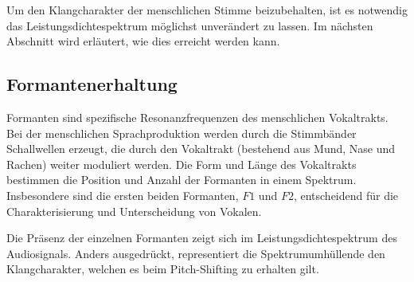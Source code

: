 
Um den Klangcharakter der menschlichen Stimme beizubehalten,
ist es notwendig das Leistungsdichtespektrum möglichst unverändert zu lassen.
Im nächsten Abschnitt wird erläutert, wie dies erreicht werden kann.


\subsection{Formantenerhaltung
\label{autotune:subsection:formantenErhaltung}}
Formanten sind spezifische Resonanzfrequenzen des menschlichen Vokaltrakts.
Bei der menschlichen Sprachproduktion werden durch die Stimmbänder Schallwellen erzeugt,
die durch den Vokaltrakt (bestehend aus Mund, Nase und Rachen) weiter moduliert werden.
Die Form und Länge des Vokaltrakts bestimmen die Position und Anzahl der Formanten in einem Spektrum. 
Insbesondere sind die ersten beiden Formanten, $F1$ und $F2$,
entscheidend für die Charakterisierung und Unterscheidung von Vokalen.

Die Präsenz der einzelnen Formanten zeigt sich im Leistungsdichtespektrum des Audiosignals.
Anders ausgedrückt, representiert die Spektrumumhüllende den Klangcharakter, welchen es beim Pitch-Shifting zu erhalten gilt.

